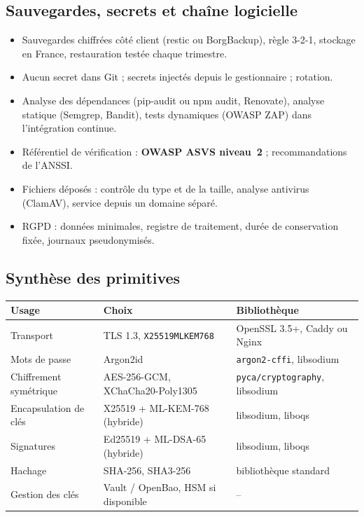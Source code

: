 \documentclass[11pt,a4paper]{article}
\begin{document}
\subsection{Sauvegardes, secrets et chaîne logicielle}
\begin{itemize}
  \item Sauvegardes chiffrées côté client (restic ou BorgBackup), règle 3-2-1,
  stockage en France, restauration testée chaque trimestre.
  \item Aucun secret dans Git ; secrets injectés depuis le gestionnaire ; rotation.
  \item Analyse des dépendances (pip-audit ou npm audit, Renovate), analyse statique
  (Semgrep, Bandit), tests dynamiques (OWASP ZAP) dans l'intégration continue.
  \item Référentiel de vérification : \textbf{OWASP ASVS niveau~2} ; recommandations de
  l'ANSSI.
  \item Fichiers déposés : contrôle du type et de la taille, analyse antivirus
  (ClamAV), service depuis un domaine séparé.
  \item RGPD : données minimales, registre de traitement, durée de conservation fixée,
  journaux pseudonymisés.
\end{itemize}

\subsection{Synthèse des primitives}
\begin{center}\small
\begin{tabularx}{\linewidth}{P{4.0cm} P{5.2cm} L}
\toprule
\textbf{Usage} & \textbf{Choix} & \textbf{Bibliothèque}\\
\midrule
Transport & TLS 1.3, \texttt{X25519MLKEM768} & OpenSSL 3.5+, Caddy ou Nginx\\
Mots de passe & Argon2id & \texttt{argon2-cffi}, libsodium\\
Chiffrement symétrique & AES-256-GCM, XChaCha20-Poly1305 & \texttt{pyca/cryptography}, libsodium\\
Encapsulation de clés & X25519 + ML-KEM-768 (hybride) & libsodium, liboqs\\
Signatures & Ed25519 + ML-DSA-65 (hybride) & libsodium, liboqs\\
Hachage & SHA-256, SHA3-256 & bibliothèque standard\\
Gestion des clés & Vault / OpenBao, HSM si disponible & --\\
\bottomrule
\end{tabularx}
\end{center}
\end{document}
